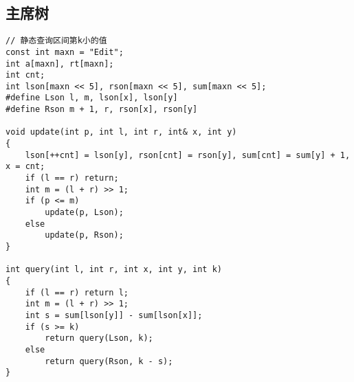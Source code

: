 \documentclass[a4]{article}
\begin{document}
\subsection{主席树}
\begin{lstlisting}
// 静态查询区间第k小的值
const int maxn = "Edit";
int a[maxn], rt[maxn];
int cnt;
int lson[maxn << 5], rson[maxn << 5], sum[maxn << 5];
#define Lson l, m, lson[x], lson[y]
#define Rson m + 1, r, rson[x], rson[y]

void update(int p, int l, int r, int& x, int y)
{
    lson[++cnt] = lson[y], rson[cnt] = rson[y], sum[cnt] = sum[y] + 1, x = cnt;
    if (l == r) return;
    int m = (l + r) >> 1;
    if (p <= m)
        update(p, Lson);
    else
        update(p, Rson);
}

int query(int l, int r, int x, int y, int k)
{
    if (l == r) return l;
    int m = (l + r) >> 1;
    int s = sum[lson[y]] - sum[lson[x]];
    if (s >= k)
        return query(Lson, k);
    else
        return query(Rson, k - s);
}
\end{lstlisting}
\end{document}
